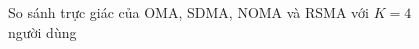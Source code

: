 \begin{figure}[htbp]
\centering
\resizebox{\textwidth}{!}{}
\caption{So sánh trực giác của OMA, SDMA, NOMA và RSMA với $K=4$ người dùng}
\label{fig:ch1-da-truy-cap}
\end{figure}
